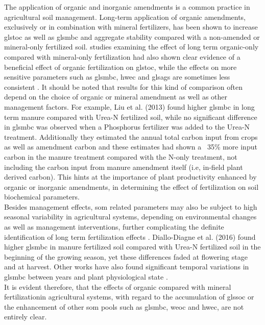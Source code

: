  		The application of organic and inorganic amendments is a common practice in agricultural soil management. Long-term application of organic amendments, exclusively or in combination with mineral fertilizers, has been shown to increase gls{toc} \citep{heinze2010, yang2012} as well as gls{mbc} \citep{luo2015, marschner2003a}and aggregate stability\citep{ huang2010, yu2012} compared with a non-amended or mineral-only fertilized soil.
 		studies examining the effect of long term organic-only compared with mineral-only fertilization had  also shown clear evidence of a beneficial effect of organic fertilization on gls{toc}\citep{santos2012, luo2015}, while the effects on more sensitive parameters such as gls{mbc}, \gls{hwec} and gls{ags} are sometimes less consistent \citep{albiach2001, mahmood1997}. It should be noted that results for this kind of comparison often depend on the choice of organic or mineral amendment as well as other management factors.    
 		For example, Liu et al. (2013) found  higher gls{mbc} in long term manure compared with Urea-N fertilized soil, while no significant difference in gls{mbc} was observed when a Phosphorus fertilizer was added to the Urea-N treatment. Additionally they estimated the annual total carbon input from crops as well as amendment carbon and these estimates had shown a ~35\% more input carbon in the manure treatment compared with the N-only treatment, not including the carbon input from manure amendment itself (i.e, in-field plant derived carbon). This hints at the importance  of plant productivity enhanced by organic or inorganic amendments, in determining the  effect of fertilization on soil biochemical parameters.\\
 		Besides management effects, \gls{som}  related parameters may also be subject to high seasonal variability in agricultural systems, depending on environmental changes as well as management interventions, further complicating the definite identification of long term fertilization effects .
 		Diallo-Diagne et al. (2016) found higher gls{mbc} in manure fertilized soil compared with Urea-N fertilized soil in the beginning of the growing season, yet these differences faded at flowering stage and at harvest. Other works have also found significant temporal variations in gls{mbc} between years \citep{kaiser1995} and plant physiological state \citep{jat2020}.\\
		It is evident therefore, that the effects of organic compared with mineral fertilizationin agricultural systems, with regard to the accumulation of gls{soc} or the enhancement of other \gls{som} pools such as gls{mbc}, \gls{weoc} and \gls{hwec}, are not entirely clear.

